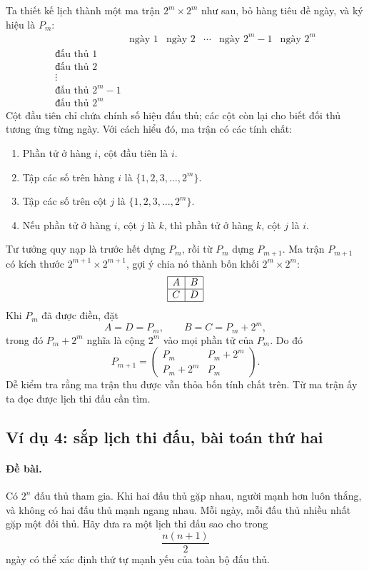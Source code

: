 \documentclass[11pt]{article}
\begin{document}
Ta thiết kế lịch thành một ma trận $2^m\times 2^m$ như sau, bỏ hàng tiêu đề
ngày, và ký hiệu là $P_m$:
\[
\begin{array}{c|ccccc}
& \text{ngày 1} & \text{ngày 2} & \cdots & \text{ngày }2^m-1
& \text{ngày }2^m\\ \hline
\text{đấu thủ }1\\
\text{đấu thủ }2\\
\vdots\\
\text{đấu thủ }2^m-1\\
\text{đấu thủ }2^m
\end{array}
\]
Cột đầu tiên chỉ chứa chính số hiệu đấu thủ; các cột còn lại cho biết đối thủ
tương ứng từng ngày. Với cách hiểu đó, ma trận có các tính chất:
\begin{enumerate}
  \item Phần tử ở hàng $i$, cột đầu tiên là $i$.
  \item Tập các số trên hàng $i$ là $\{1,2,3,\ldots,2^m\}$.
  \item Tập các số trên cột $j$ là $\{1,2,3,\ldots,2^m\}$.
  \item Nếu phần tử ở hàng $i$, cột $j$ là $k$, thì phần tử ở hàng $k$, cột
  $j$ là $i$.
\end{enumerate}

Tư tưởng quy nạp là trước hết dựng $P_m$, rồi từ $P_m$ dựng $P_{m+1}$.
Ma trận $P_{m+1}$ có kích thước $2^{m+1}\times 2^{m+1}$, gợi ý chia nó thành
bốn khối $2^m\times 2^m$:
\[
\begin{array}{|c|c|}
\hline
A & B\\ \hline
C & D\\ \hline
\end{array}
\]
Khi $P_m$ đã được điền, đặt
\[
  A=D=P_m,\qquad B=C=P_m+2^m,
\]
trong đó $P_m+2^m$ nghĩa là cộng $2^m$ vào mọi phần tử của $P_m$. Do đó
\[
  P_{m+1}=
  \begin{pmatrix}
    P_m & P_m+2^m\\
    P_m+2^m & P_m
  \end{pmatrix}.
\]
Dễ kiểm tra rằng ma trận thu được vẫn thỏa bốn tính chất trên. Từ ma trận ấy
ta đọc được lịch thi đấu cần tìm.

\subsection{Ví dụ 4: sắp lịch thi đấu, bài toán thứ hai}

\paragraph{Đề bài.}
Có $2^n$ đấu thủ tham gia. Khi hai đấu thủ gặp nhau, người mạnh hơn luôn
thắng, và không có hai đấu thủ mạnh ngang nhau. Mỗi ngày, mỗi đấu thủ nhiều
nhất gặp một đối thủ. Hãy đưa ra một lịch thi đấu sao cho trong
\[
  \frac{n(n+1)}{2}
\]
ngày có thể xác định thứ tự mạnh yếu của toàn bộ đấu thủ.
\end{document}
